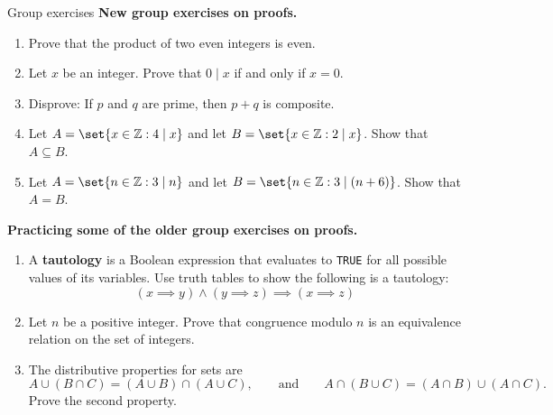 \documentclass[10pt]{beamer}
\begin{document}
\begin{frame}{Group exercises}
\footnotesize
\textbf{New group exercises on proofs.}
\vspace{-.3em}
\begin{enumerate}
	\item  Prove that the product of two even integers is even.
	\item  Let $x$ be an integer. Prove that $0 \mid x$ if and only if $x=0$.
	\item Disprove: If $p$ and $q$ are prime, then $p+q$ is composite.
	\item Let $A = \set{x \in \mathbb{Z} : 4 \mid x}$ and let $B = \set{x \in \mathbb{Z} : 2 \mid x}$. Show that $A \subseteq B$. 
	\item Let $A = \set{n \in \mathbb{Z} : 3 \mid n}$ and let $B = \set{n \in \mathbb{Z} : 3 \mid (n+6)}$. Show that $A=B$. 
\end{enumerate}
\vfill 
\vspace{-.5em}
\textbf{Practicing some of the older group exercises on proofs.}
\vspace{-.3em}
\begin{enumerate}
\item A \textbf{tautology} is a Boolean expression that evaluates to \texttt{TRUE} for all possible values of its variables. Use truth tables to show the following is a tautology:
\[ (x \implies y) \land (y \implies z) \implies (x \implies z) \]
\item Let $n$ be a positive integer. Prove that congruence modulo $n$ is an equivalence relation on the set of integers.
\item The distributive properties for sets are
\[ A \cup (B \cap C) = (A \cup B) \cap (A \cup C), \qquad \text{and} \qquad A \cap (B \cup C) = (A \cap B) \cup (A \cap C). \]
Prove the second property.
\end{enumerate}
%	

\end{frame}
\end{document}
